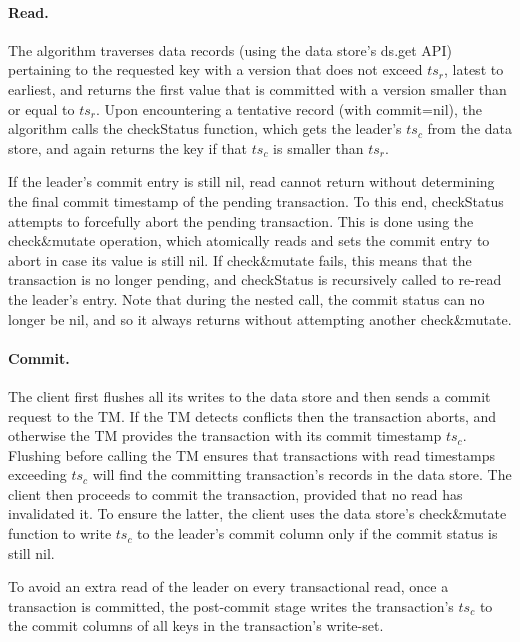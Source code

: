 \paragraph{Read.}
The algorithm traverses data  records (using the data store's ds.get API) pertaining
to the requested key with a version that does not exceed $ts_r$, latest to earliest, and returns the first value that is committed
with a  version smaller than or equal to $ts_r$. Upon
encountering a tentative record (with commit=nil), the algorithm calls the {\sc checkStatus} function, which
gets the leader's $ts_c$ from the data store, and again returns the key if that $ts_c$ is smaller than $ts_r$. 

If the leader's commit entry is still nil, read cannot return without determining the final commit timestamp
of the pending transaction. 
To this end, {\sc checkStatus} attempts to forcefully abort the pending transaction. This is done using the
 {check\&mutate} operation, which atomically reads and sets the commit entry to abort in case its value is still nil.
If check\&mutate fails, this means that the transaction is no longer pending, and {\sc checkStatus} is recursively called to
re-read the leader's entry. Note that during the nested call, the commit status can no longer be nil, and so it
always returns without attempting another check\&mutate.
 


\paragraph{Commit.}
The client first flushes all its writes to the data store and then sends a commit request to the TM. 
If the TM detects conflicts then the transaction aborts, and otherwise the TM provides the transaction with its commit  timestamp $ts_c$. 
Flushing before calling the TM ensures that transactions with read timestamps exceeding $ts_c$ 
will find the committing transaction's records in the data store.
The client then proceeds to commit the transaction, provided that no read has invalidated it. To ensure the latter, the client uses 
the data store's check\&mutate function to write $ts_c$ to the leader's commit column 
only if the commit status is still nil.

To avoid an extra read of the leader on every transactional read, once a transaction is committed, the post-commit stage writes 
the transaction's $ts_c$ to the commit columns of all keys in  the transaction's write-set. 

